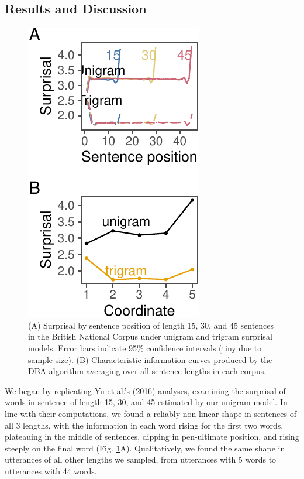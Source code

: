 \documentclass[man,floatsintext]{apa6}
\begin{document}
\hypertarget{results-and-discussion}{%
\subsection{Results and Discussion}\label{results-and-discussion}}

\begin{figure}[tb]

{\centering \includegraphics{figs/bncplots-1} 

}

\caption{(A) Surprisal by sentence position of length 15, 30, and 45 sentences in the British National Corpus under unigram and trigram surprisal models. Error bars indicate 95\% confidence intervals (tiny due to sample size). (B) Characteristic information curves produced by the DBA algorithm averaging over all sentence lengths in each corpus. }\label{fig:bncplots}
\end{figure}

We began by replicating Yu et al.'s (2016) analyses, examining the surprisal of words in sentence of length 15, 30, and 45 estimated by our unigram model. In line with their computations, we found a reliably non-linear shape in sentences of all 3 lengths, with the information in each word rising for the first two words, plateauing in the middle of sentences, dipping in pen-ultimate position, and rising steeply on the final word (Fig. \ref{fig:bncplots}A). Qualitatively, we found the same shape in utterances of all other lengths we sampled, from utterances with 5 words to utterances with 44 words.
\end{document}
